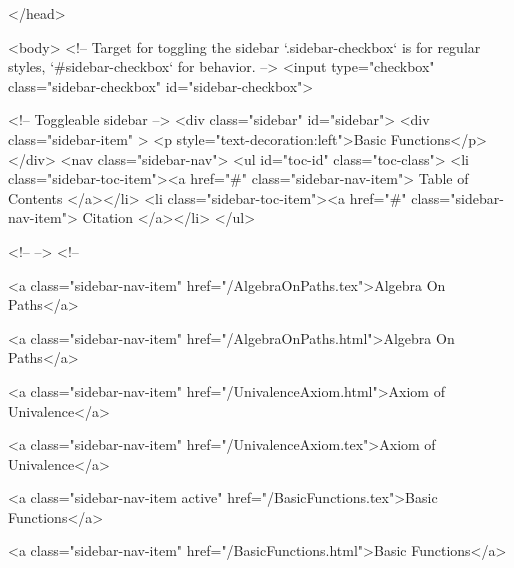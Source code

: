   
</head>




  <body>
    <!-- Target for toggling the sidebar `.sidebar-checkbox` is for regular
     styles, `#sidebar-checkbox` for behavior. -->
<input type="checkbox" class="sidebar-checkbox" id="sidebar-checkbox">

<!-- Toggleable sidebar -->
<div class="sidebar" id="sidebar">
  <div class="sidebar-item" >
    <p style="text-decoration:left">Basic Functions</p>
  </div>
  <nav class="sidebar-nav">
    <ul id="toc-id" class="toc-class">
  <li class="sidebar-toc-item"><a href="#" class="sidebar-nav-item"> Table of Contents </a></li>
  <li class="sidebar-toc-item"><a href="#" class="sidebar-nav-item"> Citation </a></li>
</ul>


    <!--  -->
    <!-- 
      
    
      
    
      
    
      
        
      
    
      
        
          <a class="sidebar-nav-item" href="/AlgebraOnPaths.tex">Algebra On Paths</a>
        
      
    
      
        
          <a class="sidebar-nav-item" href="/AlgebraOnPaths.html">Algebra On Paths</a>
        
      
    
      
        
          <a class="sidebar-nav-item" href="/UnivalenceAxiom.html">Axiom of Univalence</a>
        
      
    
      
        
          <a class="sidebar-nav-item" href="/UnivalenceAxiom.tex">Axiom of Univalence</a>
        
      
    
      
        
          <a class="sidebar-nav-item active" href="/BasicFunctions.tex">Basic Functions</a>
        
      
    
      
        
          <a class="sidebar-nav-item" href="/BasicFunctions.html">Basic Functions</a>
        
      
    
      
        
